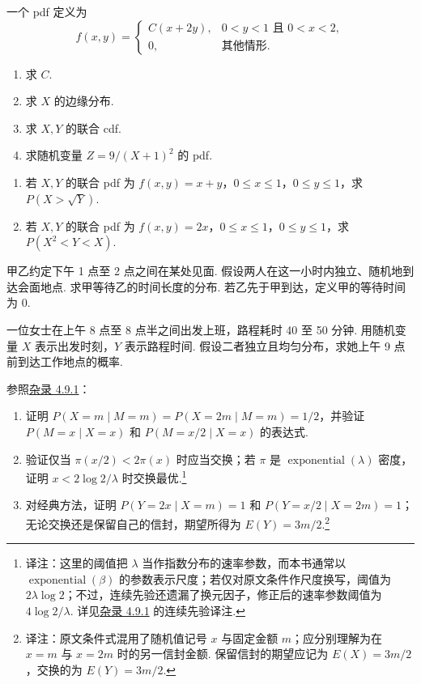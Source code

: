 \begin{exercise}\label{exercise:4.4}
一个 pdf 定义为
$$f(x,y)=\begin{cases}C(x+2y),&0<y<1\text{ 且 }0<x<2,\\0,&\text{其他情形}.\end{cases}$$
\begin{enumerate}
\item[(a)] 求 $C$.
\item[(b)] 求 $X$ 的边缘分布.
\item[(c)] 求 $X,Y$ 的联合 cdf.
\item[(d)] 求随机变量 $Z=9/(X+1)^2$ 的 pdf.
\end{enumerate}
\end{exercise}
\begin{exercise}\label{exercise:4.5}\leavevmode
\begin{enumerate}
\item[(a)] 若 $X,Y$ 的联合 pdf 为 $f(x,y)=x+y$，$0\le x\le1$，$0\le y\le1$，求 $P(X>\sqrt Y)$.
\item[(b)] 若 $X,Y$ 的联合 pdf 为 $f(x,y)=2x$，$0\le x\le1$，$0\le y\le1$，求 $P(X^2<Y<X)$.
\end{enumerate}
\end{exercise}
\begin{exercise}\label{exercise:4.6}
甲乙约定下午 1 点至 2 点之间在某处见面. 假设两人在这一小时内独立、随机地到达会面地点. 求甲等待乙的时间长度的分布. 若乙先于甲到达，定义甲的等待时间为 0.
\end{exercise}
\begin{exercise}\label{exercise:4.7}
一位女士在上午 8 点至 8 点半之间出发上班，路程耗时 40 至 50 分钟. 用随机变量 $X$ 表示出发时刻，$Y$ 表示路程时间. 假设二者独立且均匀分布，求她上午 9 点前到达工作地点的概率.
\end{exercise}
\begin{exercise}\label{exercise:4.8}
参照\hyperref[misc:4.9.1]{杂录 4.9.1}：
\begin{enumerate}
\item[(a)] 证明 $P(X=m\mid M=m)=P(X=2m\mid M=m)=1/2$，并验证 $P(M=x\mid X=x)$ 和 $P(M=x/2\mid X=x)$ 的表达式.
\item[(b)] 验证仅当 $\pi(x/2)<2\pi(x)$ 时应当交换；若 $\pi$ 是 $\operatorname{exponential}(\lambda)$ 密度，证明 $x<2\log2/\lambda$ 时交换最优.\footnote{译注：这里的阈值把 $\lambda$ 当作指数分布的速率参数，而本书通常以 $\operatorname{exponential}(\beta)$ 的参数表示尺度；若仅对原文条件作尺度换写，阈值为 $2\lambda\log2$；不过，连续先验还遗漏了换元因子，修正后的速率参数阈值为 $4\log2/\lambda$. 详见\hyperref[misc:4.9.1]{杂录 4.9.1} 的连续先验译注.}
\item[(c)] 对经典方法，证明 $P(Y=2x\mid X=m)=1$ 和 $P(Y=x/2\mid X=2m)=1$；无论交换还是保留自己的信封，期望所得为 $E(Y)=3m/2$.\footnote{译注：原文条件式混用了随机值记号 $x$ 与固定金额 $m$；应分别理解为在 $x=m$ 与 $x=2m$ 时的另一信封金额. 保留信封的期望应记为 $E(X)=3m/2$，交换的为 $E(Y)=3m/2$.}
\end{enumerate}
\end{exercise}
